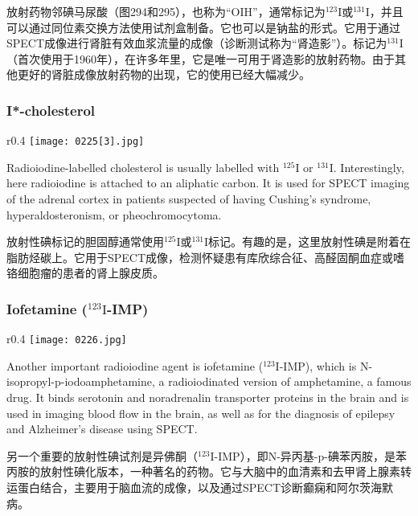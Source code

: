 \documentclass[dvipsnames, svgnames,a4paper,11pt]{article}
\begin{document}
放射药物邻碘马尿酸（图294和295），也称为“OIH”，通常标记为\(\mathrm{^{123}I}\)或\(\mathrm{^{131}I}\)，并且可以通过同位素交换方法使用试剂盒制备。它也可以是钠盐的形式。它用于通过SPECT成像进行肾脏有效血浆流量的成像（诊断测试称为“肾造影”）。标记为\(\mathrm{^{131}I}\)（首次使用于1960年），在许多年里，它是唯一可用于肾造影的放射药物。由于其他更好的肾脏成像放射药物的出现，它的使用已经大幅减少。

\subsubsection{I*-cholesterol}  

\begin{wrapfigure}{r}{0.4\textwidth}
    \centering
    \texttt{[image: 0225[3].jpg]}
     \label{fig296}
\end{wrapfigure}
Radioiodine-labelled cholesterol is usually labelled with \(\mathrm{^{125}I}\) or \(\mathrm{^{131}I}\). Interestingly, here radioiodine is attached to an aliphatic carbon. It is used for SPECT imaging of the adrenal cortex in patients suspected of having Cushing's syndrome, hyperaldosteronism, or pheochromocytoma.

放射性碘标记的胆固醇通常使用\(\mathrm{^{125}I}\)或\(\mathrm{^{131}I}\)标记。有趣的是，这里放射性碘是附着在脂肪烃碳上。它用于SPECT成像，检测怀疑患有库欣综合征、高醛固酮血症或嗜铬细胞瘤的患者的肾上腺皮质。

\subsubsection{Iofetamine (\(\mathrm{^{123}I}\)-IMP)}  

\begin{wrapfigure}{r}{0.4\textwidth}
    \centering
    \texttt{[image: 0226.jpg]}
     \label{fig297}
\end{wrapfigure}

Another important radioiodine agent is iofetamine (\(\mathrm{^{123}I}\)-IMP), which is N-isopropyl-p-iodoamphetamine, a radioiodinated version of amphetamine, a famous drug. It binds serotonin and noradrenalin transporter proteins in the brain and is used in imaging blood flow in the brain, as well as for the diagnosis of epilepsy and Alzheimer's disease using SPECT.

另一个重要的放射性碘试剂是异佛酮（\(\mathrm{^{123}I}\)-IMP），即N-异丙基-p-碘苯丙胺，是苯丙胺的放射性碘化版本，一种著名的药物。它与大脑中的血清素和去甲肾上腺素转运蛋白结合，主要用于脑血流的成像，以及通过SPECT诊断癫痫和阿尔茨海默病。
\end{document}

